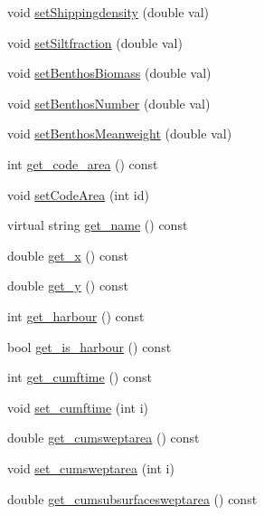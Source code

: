 \begin{DoxyCompactItemize}
\item 
void \mbox{\hyperlink{class_node_data_a8fcad2b33b0e6d8b27fb330e0ac9dc87}{set\+Shippingdensity}} (double val)
\item 
void \mbox{\hyperlink{class_node_data_a1bc687cd7cfcfc9dcfb0b28ed0018cc5}{set\+Siltfraction}} (double val)
\item 
void \mbox{\hyperlink{class_node_data_ae4ac6a1f32878111da6890804628bc09}{set\+Benthos\+Biomass}} (double val)
\item 
void \mbox{\hyperlink{class_node_data_a7ffda826e25b84bd34ff2182484f10dc}{set\+Benthos\+Number}} (double val)
\item 
void \mbox{\hyperlink{class_node_data_a60a20553a3f5eb184bf7e418bef3a551}{set\+Benthos\+Meanweight}} (double val)
\item 
int \mbox{\hyperlink{class_node_data_adf22932c2a5d4b38dabe1acbea605577}{get\+\_\+code\+\_\+area}} () const
\item 
void \mbox{\hyperlink{class_node_data_a2e935f0c3eab83e69d46561a157b02aa}{set\+Code\+Area}} (int id)
\item 
virtual string \mbox{\hyperlink{class_node_data_a2b2db7fa4779d369f8c667171d18dbad}{get\+\_\+name}} () const
\item 
double \mbox{\hyperlink{class_node_data_a259535df3dd8738ac27e966a57dcd412}{get\+\_\+x}} () const
\item 
double \mbox{\hyperlink{class_node_data_a005e2c27397f6c65c778cc740d96c838}{get\+\_\+y}} () const
\item 
int \mbox{\hyperlink{class_node_data_aaf8c095237f5d54deeb01340995d7023}{get\+\_\+harbour}} () const
\item 
bool \mbox{\hyperlink{class_node_data_a349a5b2e3705663d25fb82b591e3ca0e}{get\+\_\+is\+\_\+harbour}} () const
\item 
int \mbox{\hyperlink{class_node_data_a0f76ebd98a02531a3b2483b3558652e0}{get\+\_\+cumftime}} () const
\item 
void \mbox{\hyperlink{class_node_data_ae43f6669e46c7a072326c30e2e06ea7a}{set\+\_\+cumftime}} (int i)
\item 
double \mbox{\hyperlink{class_node_data_ae92845c304b2b48e91bd85d2783254bf}{get\+\_\+cumsweptarea}} () const
\item 
void \mbox{\hyperlink{class_node_data_a273d0cf57afd478995096541d4fbbace}{set\+\_\+cumsweptarea}} (int i)
\item 
double \mbox{\hyperlink{class_node_data_a425f8df06888e7a11ba0677a7069d0cd}{get\+\_\+cumsubsurfacesweptarea}} () const
\item 

\end{DoxyCompactItemize}
